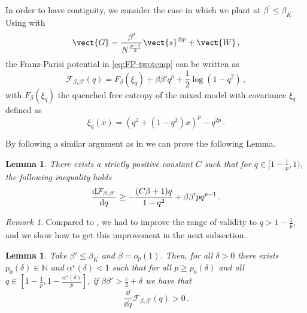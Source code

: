 \documentclass[]{article}
\theoremstyle{plain}%
\newtheorem{lemma}[theorem]{Lemma}
\theoremstyle{definition}%
\theoremstyle{remark}%
\newtheorem{remark}{Remark}
\begin{document}
In order to have contiguity, we consider the case in which we plant at $\beta^\prime \leq \beta_K$. Using \cite[Proposition 3.8]{alaoui_shattering_2024} with 
\begin{equation}
    \vect{G} = \frac{\beta'}{N^{\frac{p-1}{2}}}\vect{s}^{\otimes p} + \vect{W}\,,
\end{equation}
the Franz-Parisi potential in \cref{eq:FP-twotemp} can be written as
\begin{equation}
    \mathcal{F}_{\beta,\beta'}(q) = F_{\beta}(\xi_q) + \beta\beta'q^p + \frac{1}{2}\log(1-q^2)\,,
\end{equation}
with $F_{\beta}(\xi_q) $ the quenched free entropy of the mixed model with covariance $\xi_q$ defined as
\begin{equation}\label{eq:xi_q}
    \xi_q(x) = \left(q^2+\left(1-q^2\right) x\right)^p-q^{2 p} \,.
\end{equation}

By following a similar argument as in \cite[Proposition 3.6]{alaoui_shattering_2024} we can prove the following Lemma.

\begin{lemma}\label{lemm:lowerbound-derivative}
There exists a strictly positive constant $C$ such that for $q\in[1-\frac{1}{p},1)$, the following inequality holds
\begin{equation}\label{eq:Fder}
    \dv{\mathcal{F}_{\beta,\beta'}}{q} \geq -\frac{(C\beta + 1)q}{1-q^2} + \beta\beta'pq^{p-1} \,.
\end{equation}
\end{lemma}

\begin{remark}
Compared to \cite{alaoui_shattering_2024}, we had to improve the range of validity to $q > 1-\frac{1}{p}$, and we show how to get this improvement in the next subsection.
\end{remark}



\begin{lemma}\label{lem:beta-d-plus}
Take $\beta'\leq\beta_K$ and $\beta = o_p(1)$. Then, for all $\delta > 0$ 
there exists $p_0(\delta) \in \mathbb{N}$ and $\alpha^\star(\delta) < 1$ such that for all $p \geq p_0(\delta)$ and all $q \in [1-\frac{1}{p}, 1- \frac{\alpha^\star(\delta)}{p}]$, if $\beta\beta' > \frac{e}{2} + \delta$ we have that 
\begin{equation}
    \frac{ \dd }{ \dd q} \mathcal{F}_{\beta,\beta'} (q) > 0 \,.
\end{equation}
\end{lemma}
\end{document}
